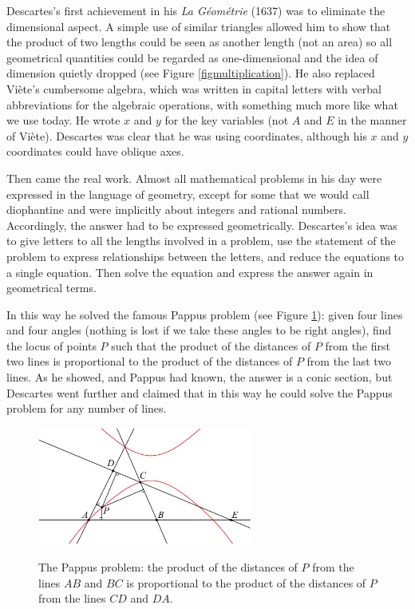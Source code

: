 Descartes's first achievement in his \emph{La G\'eom\'etrie} (1637)
was to eliminate the dimensional
%
aspect. A simple use of similar
triangles allowed him to show that the product of two lengths could
be seen as another length (not an area) so all geometrical quantities
could be regarded as one-dimensional and the idea of dimension quietly
dropped (see Figure \ref{figmultiplication}). He also replaced Vi\`ete's
cumbersome algebra, which was written in capital letters with verbal
abbreviations for the algebraic operations, with something much more like
what we use today.  He wrote $x$ and $y$ for the key variables (not $A$
and $E$ in the manner of Vi\`ete). Descartes was clear that he was using
%
coordinates, although his $x$ and $y$ coordinates could have oblique axes.


Then came the real work. Almost all mathematical problems in his day
were expressed in the language of geometry, except for some that
we would call diophantine
%
and were implicitly about integers and
rational numbers. Accordingly, the answer had to be expressed
geometrically. Descartes's idea was to give letters to all the lengths
involved in a problem, use the statement of the problem to express
relationships between the letters, and reduce the equations to a
single equation. Then solve the equation and express the answer again
in geometrical terms.

 In this way he solved the famous Pappus problem
%
(see Figure
 \ref{figPappusproblem}): given four lines and four angles (nothing is
 lost if we take these angles to be right angles), find the locus of
 points $P$ such that the product of the distances of $P$ from the first
 two lines is proportional to the product of the distances of $P$ from
 the last two lines. As he showed, and Pappus had known, the answer is
 a conic section, but  Descartes went further and claimed that in this
 way he could solve the Pappus problem for any number of lines.

\begin{figure}
\includegraphics[width=200pt]{main/Pappusproblem}
\caption{The Pappus problem: the product of the distances of $P$ from
the lines $AB$ and $BC$ is proportional to the product of the distances
of $P$ from the lines $CD$ and $DA$.}
%
\label{figPappusproblem}
\end{figure}

